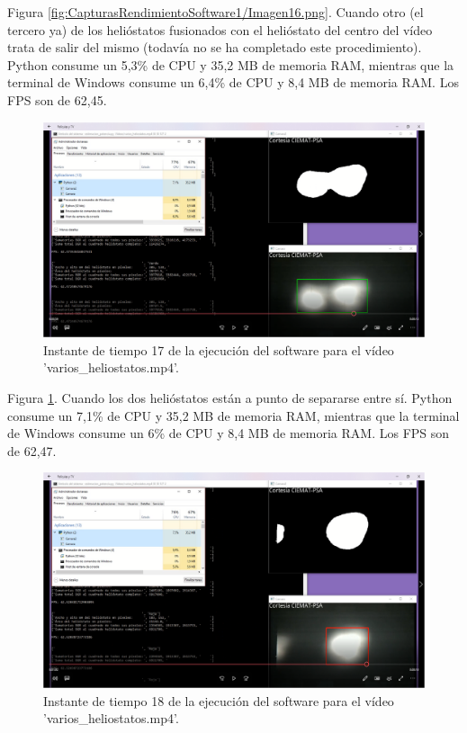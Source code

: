 Figura \ref{fig:CapturasRendimientoSoftware1/Imagen16.png}. Cuando otro (el tercero ya) de los helióstatos fusionados con el helióstato del centro del vídeo trata de salir del mismo (todavía no se ha completado este procedimiento). Python consume un 5,3\% de CPU y 35,2 MB de memoria RAM, mientras que la terminal de Windows consume un 6,4\% de CPU y 8,4 MB de memoria RAM. Los FPS son de 62,45.

\begin{figure}[h!]
  	\centering
	\includegraphics[width=\textwidth]{CapturasRendimientoSoftware1/Imagen17.png}
	\caption{Instante de tiempo 17 de la ejecución del software para el vídeo 'varios\_heliostatos.mp4'.
	\label{fig:CapturasRendimientoSoftware1/Imagen17.png}}
\end{figure}

Figura \ref{fig:CapturasRendimientoSoftware1/Imagen17.png}. Cuando los dos helióstatos están a punto de separarse entre sí. Python consume un 7,1\% de CPU y 35,2 MB de memoria RAM, mientras que la terminal de Windows consume un 6\% de CPU y 8,4 MB de memoria RAM. Los FPS son de 62,47.

\begin{figure}[h!]
  	\centering
	\includegraphics[width=\textwidth]{CapturasRendimientoSoftware1/Imagen18.png}
	\caption{Instante de tiempo 18 de la ejecución del software para el vídeo 'varios\_heliostatos.mp4'.
	\label{fig:CapturasRendimientoSoftware1/Imagen18.png}}
\end{figure}

